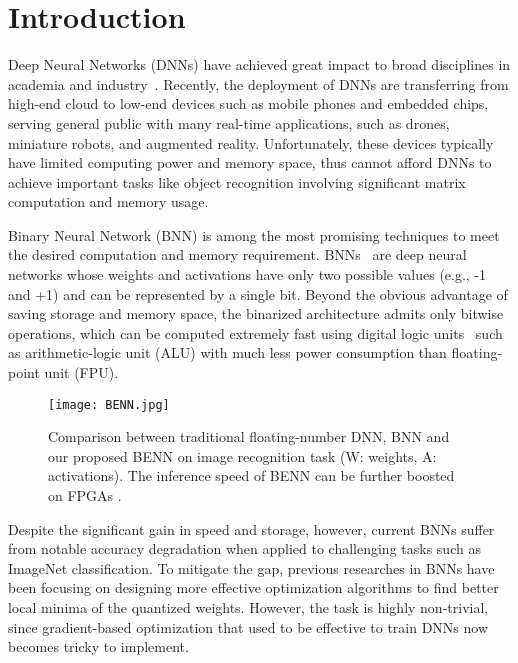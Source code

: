 \documentclass[10pt,twocolumn,letterpaper]{article}
\begin{document}
\section{Introduction}
\vspace{-2mm}

Deep Neural Networks (DNNs) have achieved great impact to broad disciplines in academia and industry~\cite{szegedy2015going, krizhevsky2012imagenet}. Recently, the deployment of DNNs are transferring from high-end cloud to low-end devices such as mobile phones and embedded chips, serving general public with many real-time applications, such as drones, miniature robots, and augmented reality.  
Unfortunately, these devices typically have limited computing power and memory space, thus cannot afford DNNs to achieve important tasks like object recognition involving significant matrix computation and memory usage. 

Binary Neural Network (BNN) is among the most promising techniques to meet the desired computation and memory requirement. BNNs~\cite{hubara2016binarized} are deep neural networks whose weights and activations have only two possible values (e.g., -1 and +1) and can be represented by a single bit. Beyond the obvious advantage of saving storage and memory space, the binarized architecture admits only bitwise operations, which can be computed extremely fast using digital logic units~\cite{govindu2004analysis} such as arithmetic-logic unit (ALU) with much less power consumption than floating-point unit (FPU). 

\begin{figure}
    \vspace{2mm}
    \centering
    \texttt{[image: BENN.jpg]}
    \vspace{-3mm}
    \caption{Comparison between traditional floating-number DNN, BNN and our proposed BENN on image recognition task (W: weights, A: activations). The inference speed of BENN can be further boosted on FPGAs \cite{zhao2017accelerating}.}
    \label{fig:benn}
    \vspace{-5mm}
\end{figure}

Despite the significant gain in speed and storage, however, current BNNs suffer from notable accuracy degradation when applied to challenging tasks such as ImageNet classification. To mitigate the gap, previous researches in BNNs have been focusing on designing more effective optimization algorithms to find better local minima of the quantized weights. However, the task is highly non-trivial, since gradient-based optimization that used to be effective to train DNNs now becomes tricky to implement. %
\end{document}
